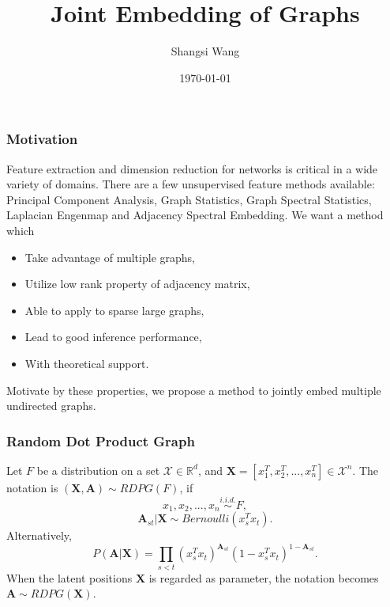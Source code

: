 \documentclass[]{beamer}
\title{Joint Embedding of Graphs}    %
\author{Shangsi Wang}                 %
\institute{Johns Hopkins University}      %
\date{\today}                    %
\newcommand{\bA}{\mathbf{A}}
\newcommand{\bX}{\mathbf{X}}
\begin{document}
\begin{frame}
  \titlepage
\end{frame}

\section[Introduction]{}




\begin{frame}
	\frametitle{Motivation}
	Feature extraction and dimension reduction for networks is critical in a wide variety of domains. There are a few unsupervised feature methods available: Principal Component Analysis, Graph Statistics, Graph Spectral Statistics, Laplacian Engenmap and Adjacency Spectral Embedding. We want a method which 
	\begin{itemize}
		\item Take advantage of multiple graphs,
		\item Utilize low rank property of adjacency matrix,
		\item Able to apply to sparse large graphs,
		\item Lead to good inference performance,
		\item With theoretical support. 
	\end{itemize}
	Motivate by these properties, we propose a method to jointly embed multiple undirected graphs. 
\end{frame}

\begin{frame}
	\frametitle{Random Dot Product Graph}
Let $F$ be a distribution on a set $\mathcal{X} \in \mathbb{R}^d$, and $\bX=[x_1^T,x_2^T,...,x_n^T] \in \mathcal{X}^n$. The notation is $(\bX,\bA) \sim RDPG(F)$, if
\[x_1,x_2,...,x_n \overset{i.i.d.}{\sim} F,\] 
	\[ \bA_{st}|\bX \sim Bernoulli(x_s^T x_t). \]
	Alternatively,
	\[ P(\bA|\bX) = \prod_{s<t} (x_s^T x_t) ^{ \bA_{st}} (1-x_s^T x_t)^{1- \bA_{st}}.\]
	When the latent positions $\bX$ is regarded as parameter, the notation becomes $\bA \sim RDPG(\bX)$.
\end{frame}
\end{document}
